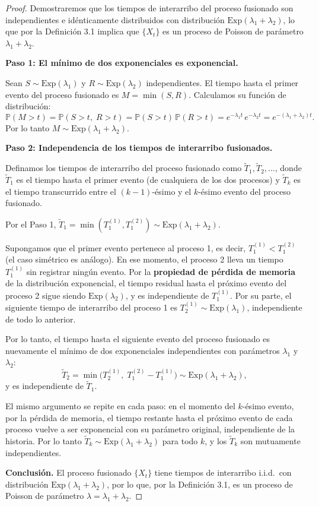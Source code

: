 \documentclass[12pt]{book}
\begin{document}
\begin{proof}
Demostraremos que los tiempos de interarribo del proceso fusionado son independientes e idénticamente distribuidos con distribución $\mathrm{Exp}(\lambda_1 + \lambda_2)$, lo que por la Definición 3.1 implica que $\{X_t\}$ es un proceso de Poisson de parámetro $\lambda_1 + \lambda_2$.

\medskip
\textbf{Paso 1: El mínimo de dos exponenciales es exponencial.}

Sean $S \sim \mathrm{Exp}(\lambda_1)$ y $R \sim \mathrm{Exp}(\lambda_2)$ independientes. El tiempo hasta el primer evento del proceso fusionado es $M = \min(S, R)$. Calculamos su función de distribución:
\[
    \mathbb{P}(M > t) = \mathbb{P}(S > t,\; R > t) = \mathbb{P}(S > t)\,\mathbb{P}(R > t) = e^{-\lambda_1 t}\,e^{-\lambda_2 t} = e^{-(\lambda_1 + \lambda_2)t}.
\]
Por lo tanto $M \sim \mathrm{Exp}(\lambda_1 + \lambda_2)$.

\medskip
\textbf{Paso 2: Independencia de los tiempos de interarribo fusionados.}

Definamos los tiempos de interarribo del proceso fusionado como $\tilde{T}_1, \tilde{T}_2, \ldots$, donde $\tilde{T}_1$ es el tiempo hasta el primer evento (de cualquiera de los dos procesos) y $\tilde{T}_k$ es el tiempo transcurrido entre el $(k-1)$-ésimo y el $k$-ésimo evento del proceso fusionado.

Por el Paso 1, $\tilde{T}_1 = \min(T_1^{(1)}, T_1^{(2)}) \sim \mathrm{Exp}(\lambda_1 + \lambda_2)$.

Supongamos que el primer evento pertenece al proceso 1, es decir, $T_1^{(1)} < T_1^{(2)}$ (el caso simétrico es análogo). En ese momento, el proceso 2 lleva un tiempo $T_1^{(1)}$ sin registrar ningún evento. Por la \textbf{propiedad de pérdida de memoria} de la distribución exponencial, el tiempo residual hasta el próximo evento del proceso 2 sigue siendo $\mathrm{Exp}(\lambda_2)$, y es independiente de $T_1^{(1)}$. Por su parte, el siguiente tiempo de interarribo del proceso 1 es $T_2^{(1)} \sim \mathrm{Exp}(\lambda_1)$, independiente de todo lo anterior.

Por lo tanto, el tiempo hasta el siguiente evento del proceso fusionado es nuevamente el mínimo de dos exponenciales independientes con parámetros $\lambda_1$ y $\lambda_2$:
\[
    \tilde{T}_2 = \min\!\bigl(T_2^{(1)},\; T_1^{(2)} - T_1^{(1)}\bigr) \sim \mathrm{Exp}(\lambda_1 + \lambda_2),
\]
y es independiente de $\tilde{T}_1$.

El mismo argumento se repite en cada paso: en el momento del $k$-ésimo evento, por la pérdida de memoria, el tiempo restante hasta el próximo evento de cada proceso vuelve a ser exponencial con su parámetro original, independiente de la historia. Por lo tanto $\tilde{T}_k \sim \mathrm{Exp}(\lambda_1 + \lambda_2)$ para todo $k$, y los $\tilde{T}_k$ son mutuamente independientes.

\medskip
\textbf{Conclusión.} El proceso fusionado $\{X_t\}$ tiene tiempos de interarribo i.i.d.\ con distribución $\mathrm{Exp}(\lambda_1 + \lambda_2)$, por lo que, por la Definición 3.1, es un proceso de Poisson de parámetro $\lambda = \lambda_1 + \lambda_2$.
\end{proof}
\end{document}
